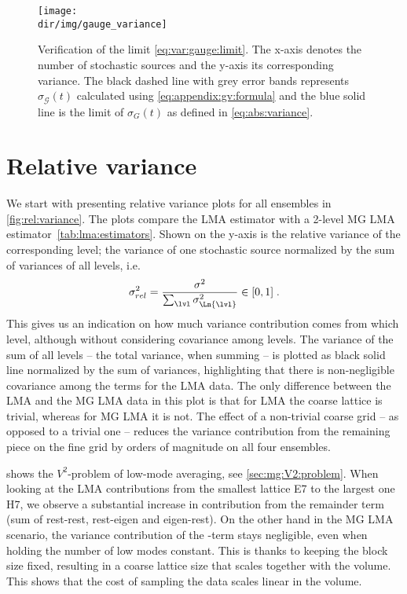 \begin{figure}
\centering
\texttt{[image: \\dir/img/gauge\_variance]}
\caption{
Verification of the limit \cref{eq:var:gauge:limit}.
The x-axis denotes the number of stochastic sources and the y-axis its corresponding variance.
The black dashed line with grey error bands represents $\sigma_{\mathcal{G}}(t)$ calculated using \cref{eq:appendix:gv:formula} and the blue solid line is the limit of $\sigma_{G}(t)$ as defined in \cref{eq:abs:variance}.
\takenfull
}
\label{fig:gauge:variance}
\end{figure}

\section{Relative variance}

We start with presenting relative variance plots for all ensembles in \cref{fig:rel:variance}.
The plots compare the LMA estimator with a 2-level MG LMA estimator~\cref{tab:lma:estimators}.
Shown on the y-axis is the relative variance of the corresponding level; the variance of one stochastic source normalized by the sum of variances of all levels, i.e.
\begin{equation} \label{eq:rel:variance}
\sigma_{rel}^{2} = \frac{\sigma^{2}}{ \sum_{\lvl} \sigma_{\Ln{\lvl}}^{2} } \in [0, 1] \;.
\end{equation}
This gives us an indication on how much variance contribution comes from which level, although without considering covariance among levels.
The variance of the sum of all levels -- the total variance, when summing -- is plotted as black solid line normalized by the sum of variances, highlighting that there is non-negligible covariance among the terms for the LMA data.
The only difference between the LMA and the MG LMA data in this plot is that for LMA the  coarse lattice is trivial, whereas for MG LMA it is not.
The effect of a non-trivial coarse grid -- as opposed to a trivial one -- reduces the variance contribution from the remaining piece on the fine grid by orders of magnitude on all four ensembles.

 shows the $V^{2}$-problem of low-mode averaging, see \cref{sec:mg:V2:problem}.
When looking at the LMA contributions from the smallest lattice E7 to the largest one H7, we observe a substantial increase in contribution from the remainder term (sum of rest-rest, rest-eigen and eigen-rest).
On the other hand in the MG LMA scenario, the variance contribution of the -term stays negligible, even when holding the number of low modes constant.
This is thanks to keeping the block size fixed, resulting in a coarse lattice size that scales together with the volume.
This shows that the cost of sampling the data scales linear in the volume.

